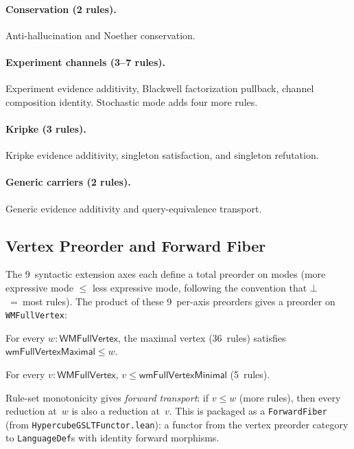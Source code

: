 \documentclass[11pt,openany]{report}
\begin{document}
\paragraph{Conservation (2 rules).}
Anti-hallucination and Noether conservation.

\paragraph{Experiment channels (3--7 rules).}
Experiment evidence additivity, Blackwell factorization pullback, channel
composition identity.  Stochastic mode adds four more rules.

\paragraph{Kripke (3 rules).}
Kripke evidence additivity, singleton satisfaction, and singleton refutation.

\paragraph{Generic carriers (2 rules).}
Generic evidence additivity and query-equivalence transport.

\subsection{Vertex Preorder and Forward Fiber}
\label{sec:wm-vertex-preorder}

The 9~syntactic extension axes each define a total preorder on modes
(more expressive mode $\le$ less expressive mode, following the convention
that $\bot$~=~most rules).  The product of these 9~per-axis preorders
gives a preorder on \texttt{WMFullVertex}:

\begin{theorem}
For every $w : \mathsf{WMFullVertex}$, the maximal vertex (36~rules)
satisfies $\mathsf{wmFullVertexMaximal} \le w$.
\end{theorem}

\begin{theorem}
For every $v : \mathsf{WMFullVertex}$, $v \le \mathsf{wmFullVertexMinimal}$
(5~rules).
\end{theorem}

\noindent
Rule-set monotonicity gives \emph{forward transport}: if $v \le w$
(more rules), then every reduction at~$w$ is also a reduction at~$v$.
This is packaged as a \texttt{ForwardFiber} (from
\texttt{HypercubeGSLTFunctor.lean}): a functor from the vertex preorder
category to \texttt{LanguageDef}s with identity forward morphisms.
\end{document}

